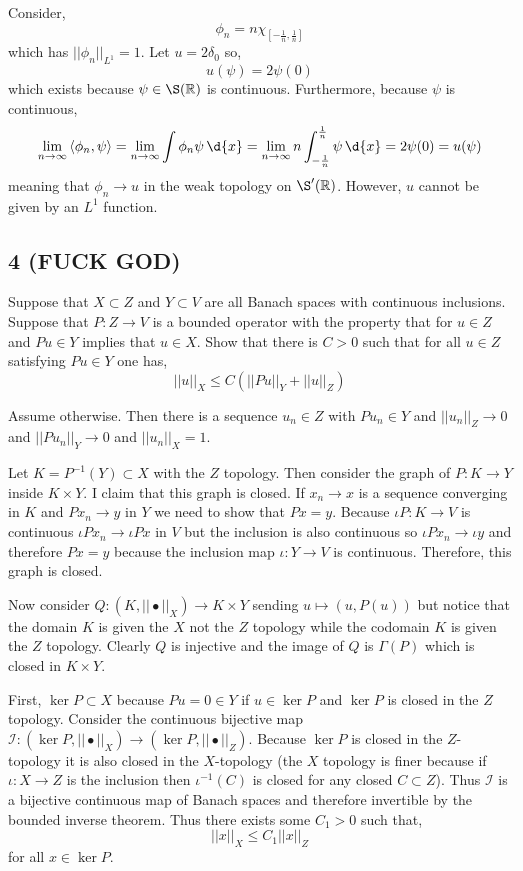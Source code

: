 \documentclass[12pt]{article}
\newcommand{\inner}[2]{\left< #1, #2 \right>}
\newcommand{\R}{\mathbb{R}}
\begin{document}
Consider,
\[ \phi_n = n \chi_{[-\frac{1}{n}, \frac{1}{n}]} \]
which has $|| \phi_n ||_{L^1} = 1$. Let $u = 2 \delta_0$ so,
\[ u(\psi) = 2 \psi(0) \]
which exists because $\psi \in \S(\R)$ is continuous. Furthermore, because $\psi$ is continuous,
\[ \lim_{n \to \infty} \inner{\phi_n}{\psi} = \lim_{n \to \infty} \int \phi_n \psi \, \d{x} = \lim_{n \to \infty} n \int_{-\frac{1}{n}}^{\frac{1}{n}} \psi \, \d{x} = 2 \psi(0) = u(\psi) \]
meaning that $\phi_n \to u$ in the weak topology on $\S'(\R)$. However, $u$ cannot be given by an $L^1$ function.

\subsection{4 (FUCK GOD)}

\begin{exercise}
Suppose that $X \subset Z$ and $Y \subset V$ are all Banach spaces with continuous inclusions. Suppose that $P : Z \to V$ is a bounded operator with the property that for $u \in Z$ and $P u \in Y$ implies that $u \in X$. Show that there is $C > 0$ such that for all $u \in Z$ satisfying $P u \in Y$ one has,
\[ || u ||_X \le C ( || P u ||_Y + || u ||_Z ) \]
\end{exercise}

Assume otherwise. Then there is a sequence $u_n \in Z$ with $P u_n \in Y$ and $|| u_n ||_Z \to 0$ and $|| P u_n ||_Y \to 0$ and $|| u_n ||_X = 1$.

Let $K = P^{-1}(Y) \subset X$ with the $Z$ topology. Then consider the graph of $P : K \to Y$ inside $K \times Y$. I claim that this graph is closed. If $x_n \to x$ is a sequence converging in $K$ and $P x_n \to y$ in $Y$ we need to show that $P x = y$. Because $\iota P : K \to V$ is continuous $\iota P x_n \to \iota P x$ in $V$ but the inclusion is also continuous so $\iota P x_n \to \iota y$ and therefore $P x = y$ because the inclusion map $\iota : Y \to V$ is continuous. Therefore, this graph is closed. 



 Now consider $Q : (K, || \bullet ||_X) \to K \times Y$ sending $u \mapsto (u, P(u))$ but notice that the domain $K$ is given the $X$ not the $Z$ topology while the codomain $K$ is given the $Z$ topology. Clearly $Q$ is injective and the image of $Q$ is $\Gamma(P)$ which is closed in $K \times Y$. 


First, $\ker{P} \subset X$ because $P u = 0 \in Y$ if $u \in \ker{P}$ and $\ker{P}$ is closed in the $Z$ topology. Consider the continuous bijective map $\mathcal{I} : (\ker{P}, || \bullet ||_X) \to (\ker{P}, || \bullet ||_Z)$. Because $\ker{P}$ is closed in the $Z$-topology it is also closed in the $X$-topology (the $X$ topology is finer because if $\iota :  X \to Z$ is the inclusion then $\iota^{-1}(C)$ is closed for any closed $C \subset Z$). Thus $\mathcal{I}$ is a bijective continuous map of Banach spaces and therefore invertible by the bounded inverse theorem. Thus there exists some $C_1 > 0$ such that,
\[ || x ||_X \le C_1 || x ||_Z \]
for all $x \in \ker{P}$. 
\end{document}
